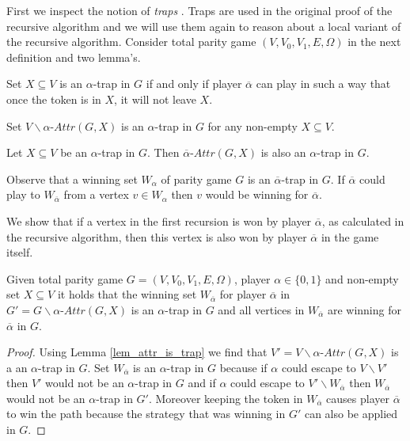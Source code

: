 First we inspect the notion of \textit{traps} \cite{ZIELONKA1998135}. Traps are used in the original proof of the recursive algorithm and we will use them again to reason about a local variant of the recursive algorithm. Consider total parity game $(V,V_0,V_1,E,\Omega)$ in the next definition and two lemma's.
\begin{definition}\cite{ZIELONKA1998135}
	Set $X \subseteq V$ is an $\alpha$-trap in $G$ if and only if player $\overline{\alpha}$ can play in such a way that once the token is in $X$, it will not leave $X$.
\end{definition}
\begin{lemma}\label{lem_attr_is_trap}
	\cite{ZIELONKA1998135}
	Set $V\backslash \alpha\textit{-Attr}(G,X)$ is an $\alpha$-trap in $G$ for any non-empty $X \subseteq V$.
\end{lemma}
\begin{lemma}
	\label{lem_attr_trap_is_trap}\cite{ZIELONKA1998135}
	Let $X \subseteq V$ be an $\alpha$-trap in $G$. Then $\overline{\alpha}\textit{-Attr}(G,X)$ is also an $\alpha$-trap in $G$.
\end{lemma}
Observe that a winning set $W_\alpha$ of parity game $G$ is an $\overline{\alpha}$-trap in $G$. If $\overline{\alpha}$ could play to $W_{\overline{\alpha}}$ from a vertex $v \in W_\alpha$ then $v$ would be winning for $\overline{\alpha}$.


We show that if a vertex in the first recursion is won by player $\overline{\alpha}$, as calculated in the recursive algorithm, then this vertex is also won by player $\overline{\alpha}$ in the game itself.
\begin{lemma}
	\label{lem_overlinealphawinner}
	Given total parity game $G = (V,V_0,V_1,E,\Omega)$, player $\alpha \in \{0,1\}$ and non-empty set $X \subseteq V$ it holds that the winning set $W_{\overline{\alpha}}$ for player $\overline{\alpha}$ in  $G' = G \backslash \alpha\textit{-Attr}(G,X)$ is an $\alpha$-trap in $G$ and all vertices in $W_{\overline{\alpha}}$ are winning for $\overline{\alpha}$ in $G$.
	\begin{proof}
		Using Lemma \ref{lem_attr_is_trap} we find that $V' = V \backslash \alpha\textit{-Attr}(G,X)$ is a an $\alpha$-trap in $G$. Set $W_{\overline{\alpha}}$ is an $\alpha$-trap in $G$ because if $\alpha$ could escape to $V \backslash V'$ then $V'$ would not be an $\alpha$-trap in $G$ and if $\alpha$ could escape to $V' \backslash W_{\overline{\alpha}}$ then $W_{\overline{\alpha}}$ would not be an $\alpha$-trap in $G'$. Moreover keeping the token in $W_{\overline{\alpha}}$ causes player $\overline{\alpha}$ to win the path because the strategy that was winning in $G'$ can also be applied in $G$.
	\end{proof}
\end{lemma}

